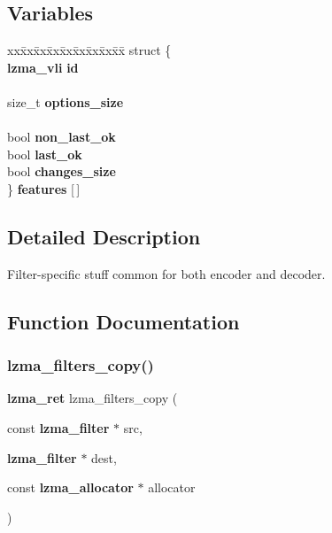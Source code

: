 \subsection*{Variables}
\begin{DoxyCompactItemize}
\item 
\mbox{\label{filter__common_8c_ab07da4108199cbfb9a4706edcfec973f}} 
\begin{tabbing}
xx\=xx\=xx\=xx\=xx\=xx\=xx\=xx\=xx\=\kill
struct \{\\
\>\textbf{ lzma\_vli} \textbf{ id}\\
\>\\
\>size\_t \textbf{ options\_size}\\
\>\\
\>bool \textbf{ non\_last\_ok}\\
\>bool \textbf{ last\_ok}\\
\>bool \textbf{ changes\_size}\\
\} {\bfseries features} [$\,$]\\

\end{tabbing}\end{DoxyCompactItemize}


\subsection{Detailed Description}
Filter-\/specific stuff common for both encoder and decoder. 



\subsection{Function Documentation}
\mbox{\label{filter__common_8c_aa09ad537fa1b32183cf82b24a1f67422}} 
\subsubsection{lzma\+\_\+filters\+\_\+copy()}
{\footnotesize\ttfamily \textbf{ lzma\+\_\+ret} lzma\+\_\+filters\+\_\+copy (\begin{DoxyParamCaption}\item[{const \textbf{ lzma\+\_\+filter} $\ast$}]{src,  }\item[{\textbf{ lzma\+\_\+filter} $\ast$}]{dest,  }\item[{const \textbf{ lzma\+\_\+allocator} $\ast$}]{allocator }\end{DoxyParamCaption})}



